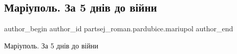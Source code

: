  
 
 
 
 

\subsection{Маріуполь. За 5 днів до війни}
\label{sec:27_02_2022.fb.partsej_roman.pardubice.mariupol.1.mar_upol__za_5_dn_v_}

\ifcmt
 author_begin
   author_id partsej_roman.pardubice.mariupol
 author_end
\fi


Маріуполь. За 5 днів до війни
